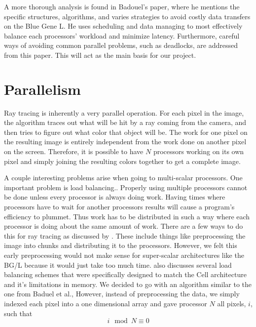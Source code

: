 \documentclass{acmsiggraph}
\begin{document}
A more thorough analysis is found in Badouel's paper, where he mentions the
specific structures, algorithms, and varies strategies to avoid costly data
transfers on the Blue Gene L.  He uses scheduling and data managing to most
effectively balance each processors' workload and minimize latency.  Furthermore,
careful ways of avoiding common parallel problems, such as deadlocks, are
addressed from this paper.  This will act as the main basis for our project. 
\cite{badouel1994dda}


\section{Parallelism}
Ray tracing is inherently a very parallel operation. For each pixel in the
image, the algorithm traces out what will be hit by a ray coming from the
camera, and then tries to figure out what color that object will be. The work
for one pixel on the resulting image is entirely independent from the work done
on another pixel on the screen. Therefore, it is possible to have $N$ processors
working on its own pixel and simply joining the resulting colors together to get
a complete image. 

A couple interesting problems arise when going to multi-scalar processors. One
important problem is load balancing.. Properly using multiple processors cannot
be done unless every processor is always doing work.  Having times where
processors have to wait for another processors results will cause a program's
efficiency to plummet. Thus work has to be distributed in such a way where each
processor is doing about the same amount of work. There are a few ways to do
this for ray tracing as discussed by \cite{badouel1994dda}. These include things
like preprocessing the image into chunks and distributing it to the processors.
However, we felt this early preprocessing would not make sense for super-scalar
architectures like the BG/L because it would just take too much time.
\cite{benthin2006rtc} also discusses several load balancing schemes that were
specifically designed to match the Cell architecture and it's limitations in
memory. We decided to go with an algorithm similar to the one from Baduel et
al., However, instead of preprocessing the data, we simply indexed each pixel
into a one dimensional array and gave processor $N$ all pixels, $i$, such that
\begin{equation}
i \mod{N} \equiv 0
\end{equation}
\end{document}
